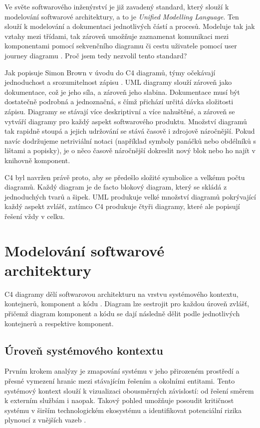\documentclass[FM,DP,fonts]{tulthesis}
\begin{document}
Ve světe softwarového inženýrství je již zavadený standard, který slouží k modelování softwarové architektury, a to je \textit{Unified Modelling Language}. Ten slouží k modelování a dokumentaci jednotlivých částí a procesů. Modeluje tak jak vztahy mezi třídami, tak zároveň umožňuje zaznamenat komunikaci mezi komponentami pomocí sekvenčního diagramu či cestu uživatele pomocí user journey diagramu \parencite{spanek-stin-5}. Proč jsem tedy nezvolil tento standard?

Jak popisuje Simon Brown v úvodu do C4 diagramů, týmy očekávají jednoduchost a srozumitelnost zápisu \parencite{c4-introduction}. UML diagramy slouží zároveň jako dokumentace, což je jeho síla, a zároveň jeho slabina. Dokumentace musí být dostatečně podrobná a jednoznačná, s čímž přichází určitá dávka složitosti zápisu. Diagramy se stávají více deskriptivní a více nahuštěné, a zároveň se vytváří diagramy pro každý aspekt softwarového produktu. Množství diagramů tak rapidně stoupá a jejich udržování se stává časově i zdrojově náročnější. Pokud navíc dodržujeme netriviální notaci (například symboly panáčků nebo obdélníků s lištami a popisky), je o něco časově náročnější dokreslit nový blok nebo ho najít v knihovně komponent.

C4 byl navržen právě proto, aby se předešlo složité symbolice a velkému počtu diagramů. Každý diagram je de facto blokový diagram, který se skládá z jednoduchých tvarů a šipek. UML produkuje velké množství diagramů pokrývající každý aspekt zvlášť, zatímco C4 produkuje čtyři diagramy, které ale popisují řešení vždy v celku.
\clearpage

\section{Modelování softwarové architektury}
C4 diagramy dělí softwarovou architekturu na vrstvu systémového kontextu, kontejnerů, komponent a kódu \parencite{c4-introduction}. Diagram lze sestrojit pro každou úroveň zvlášť, přičemž diagram komponent a kódu se dají následně dělit podle jednotlivých kontejnerů a respektive komponent.

\subsection{Úroveň systémového kontextu}
Prvním krokem analýzy je zmapování systému v jeho přirozeném prostředí a přesné vymezení hranic mezi stávajícím řešením a okolními entitami. Tento systémový kontext slouží k vizualizaci obousměrných závislostí: od řešení směrem k externím službám i naopak. Takový pohled umožňuje posoudit kritičnost systému v širším technologickém ekosystému a identifikovat potenciální rizika plynoucí z vnějších vazeb \parencite{c4-system-context}.
\end{document}
